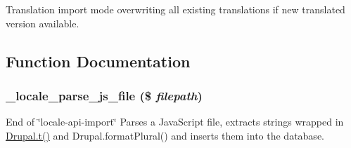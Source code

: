 Translation import mode overwriting all existing translations if new translated version available. 

\subsection{Function Documentation}
\hypertarget{locale_8inc_99a08903312f70ac95f490bdd9e1e6f1}{
\subsubsection[{\_\-locale\_\-parse\_\-js\_\-file}]{\setlength{\rightskip}{0pt plus 5cm}\_\-locale\_\-parse\_\-js\_\-file (\$ {\em filepath})}}
\label{locale_8inc_99a08903312f70ac95f490bdd9e1e6f1}


End of \char`\"{}locale-api-import\char`\"{} Parses a JavaScript file, extracts strings wrapped in \hyperlink{common_8inc_41d20f0c822bf1f3c26a97981c762665}{Drupal.t()} and Drupal.formatPlural() and inserts them into the database. 